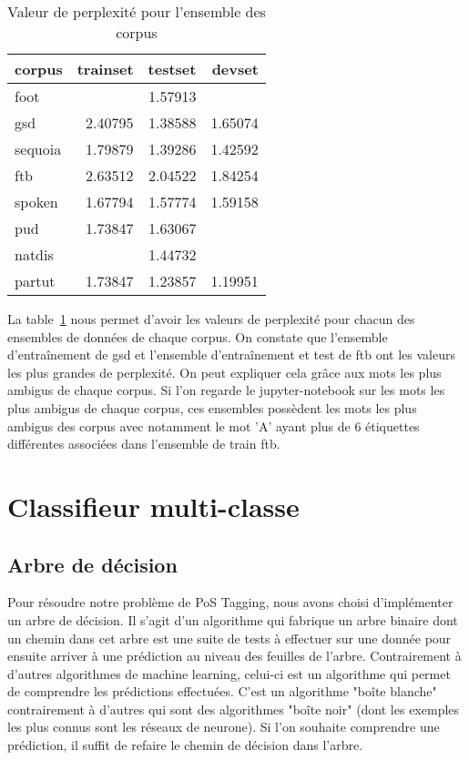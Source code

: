 \documentclass[french, 14pt]{memoir}
\begin{document}
\begin{table}
\begin{center}
\begin{tabular}{|l|r|r|r|}
\hline
corpus & trainset & testset & devset \\
\hline
 foot    &         & 1.57913 &         \\
 gsd     & 2.40795 & 1.38588 & 1.65074 \\
 sequoia & 1.79879 & 1.39286 & 1.42592 \\
 ftb     & 2.63512 & 2.04522 & 1.84254 \\
 spoken  & 1.67794 & 1.57774 & 1.59158 \\
 pud     & 1.73847 & 1.63067 &         \\
 natdis  &         & 1.44732 &         \\
 partut  & 1.73847 & 1.23857 & 1.19951 \\
\hline
\end{tabular}
\end{center}
\caption{Valeur de perplexité pour l'ensemble des corpus}
\label{perplexityTable}
\end{table}

La table~\ref{perplexityTable} nous permet d'avoir les valeurs de perplexité pour chacun des ensembles de données de chaque corpus. On constate que l'ensemble d'entraînement de gsd et l'ensemble d'entraînement et test de ftb ont les valeurs les plus grandes de perplexité. On peut expliquer cela grâce aux mots les plus ambigus de chaque corpus. Si l'on regarde le jupyter-notebook sur les mots les plus ambigus de chaque corpus, ces ensembles possèdent les mots les plus ambigus des corpus avec notamment le mot 'A' ayant plus de 6 étiquettes différentes associées dans l'ensemble de train ftb.

\chapter{Classifieur multi-classe}
\section{Arbre de décision}

Pour résoudre notre problème de PoS Tagging, nous avons choisi d'implémenter un arbre de décision. Il s'agit d'un algorithme qui fabrique un arbre binaire dont un chemin dans cet arbre est une suite de tests à effectuer sur une donnée pour ensuite arriver à une prédiction au niveau des feuilles de l'arbre. Contrairement à d'autres algorithmes de machine learning, celui-ci est un algorithme qui permet de comprendre les prédictions effectuées. C'est un algorithme "boîte blanche" contrairement à d'autres qui sont des algorithmes "boîte noir" (dont les exemples les plus connus sont les réseaux de neurone). 
Si l'on souhaite comprendre une prédiction, il suffit de refaire le chemin de décision dans l'arbre. 
\end{document}
